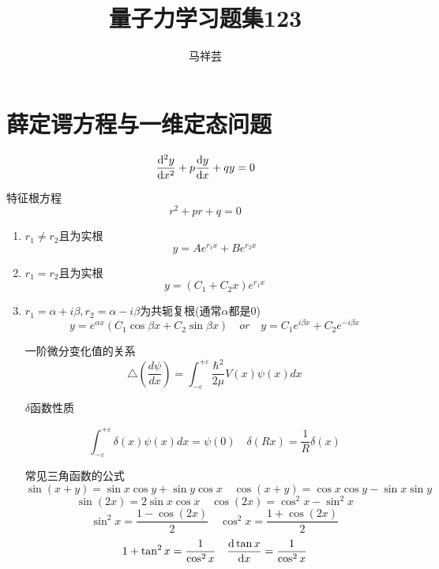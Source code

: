

\title{量子力学习题集123}
\author{马祥芸}


    \maketitle
    \tableofcontents
    \newpage

    \section{薛定谔方程与一维定态问题}

        \begin{formal}
            $$ \dv[2]{y}{x} + p\dv{y}{x} + qy = 0 $$
            
            特征根方程
            $$ r^{2} + pr + q = 0 $$

            \begin{enumerate}
                \item $r_{1} \neq r_{2}$且为实根
                $$ y = Ae^{r_{1}x} + Be^{r_{2}x} $$
                \item $r_{1} = r_{2}$且为实根
                $$ y = (C_{1}+C_{2}x)e^{r_{1}x} $$
                \item $r_{1}=\alpha + i \beta,r_{2} = \alpha - i \beta $为共轭复根(通常$\alpha$都是0)
                $$ y = e^{\alpha x} (C_{1}\cos{\beta x} + C_{2}\sin{\beta x}) \quad or \quad y = C_{1}e^{i\beta x} + C_{2}e^{-i\beta x}$$

                一阶微分变化值的关系
                $$ \triangle(\frac{d\psi}{dx}) = \int_{-\varepsilon}^{+\varepsilon}\frac{\hbar^2}{2\mu}V(x)\psi(x)dx $$    

                $\delta$函数性质

                $$\int_{-\varepsilon}^{+\varepsilon} \delta(x) \psi(x) dx =\psi(0) \quad \delta(Rx) = \frac{1}{R} \delta(x) $$

                常见三角函数的公式
                $$\sin(x+y)=\sin{x} \cos{y}+\sin{y}\cos{x} \quad \cos(x+y)=\cos{x} \cos{y} - \sin{x}\sin{y}$$ 
                $$\sin(2x) = 2\sin{x} \cos{x} \quad \cos(2x) = \cos^{2}{x} - \sin^{2}{x} $$
                $$\sin^{2}{x}=\frac{1-\cos(2x)}{2} \quad \cos^{2}{x}=\frac{1+\cos(2x)}{2} $$
                $$ 1 + \tan^{2}{x} = \frac{1}{\cos^{2}{x}} \quad \dv{\tan{x}}{x} = \frac{1}{\cos^{2}{x}} $$


\end{enumerate}
\end{formal}
